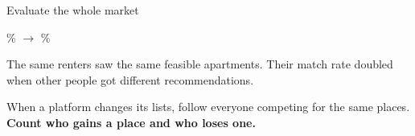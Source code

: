 \documentclass[aspectratio=169,14pt]{beamer}
\begin{document}
\begin{frame}{Evaluate the whole market}
{\LARGE \unchangedBefore\% $\longrightarrow$ \unchangedAfter\%\par}
\medskip
The same renters saw the same feasible apartments. Their match rate doubled when other people got different recommendations.
\bigskip

When a platform changes its lists, follow everyone competing for the same places. \textbf{Count who gains a place and who loses one.}
\end{frame}
\end{document}
